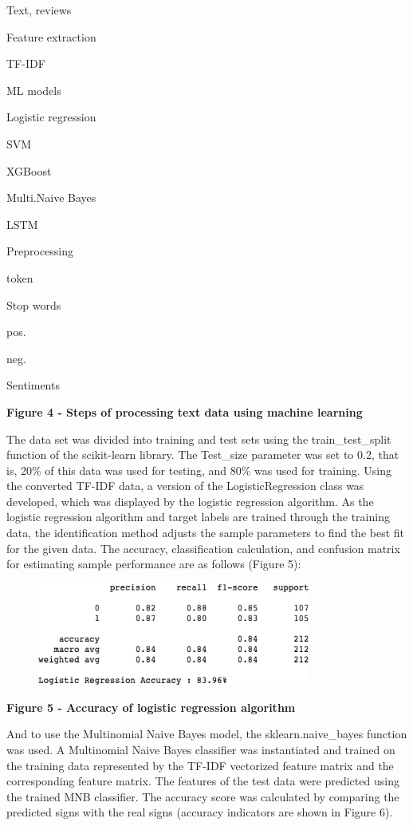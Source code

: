 Text, reviews

Feature extraction

TF-IDF

ML models

Logistic regression

SVM

XGBoost

Multi.Naive Bayes

LSTM

Preprocessing

token

Stop words

pos.

neg.

Sentiments

{\bfseries Figure 4 - Steps of processing text data using machine learning}

The data set was divided into training and test sets using the
train\_test\_split function of the scikit-learn library. The Test\_size
parameter was set to 0.2, that is, 20\% of this data was used for
testing, and 80\% was used for training. Using the converted TF-IDF
data, a version of the LogisticRegression class was developed, which was
displayed by the logistic regression algorithm. As the logistic
regression algorithm and target labels are trained through the training
data, the identification method adjusts the sample parameters to find
the best fit for the given data. The accuracy, classification
calculation, and confusion matrix for estimating sample performance are
as follows (Figure 5):

\begin{figure}[H]
	\centering
	\includegraphics[width=0.8\textwidth]{media/ict/image12}
	\caption*{}
\end{figure}


{\bfseries Figure 5 - Accuracy of logistic regression algorithm}

And to use the Multinomial Naive Bayes model, the sklearn.naive\_bayes
function was used. A Multinomial Naive Bayes classifier was instantiated
and trained on the training data represented by the TF-IDF vectorized
feature matrix and the corresponding feature matrix. The features of the
test data were predicted using the trained MNB classifier. The accuracy
score was calculated by comparing the predicted signs with the real
signs (accuracy indicators are shown in Figure 6).

